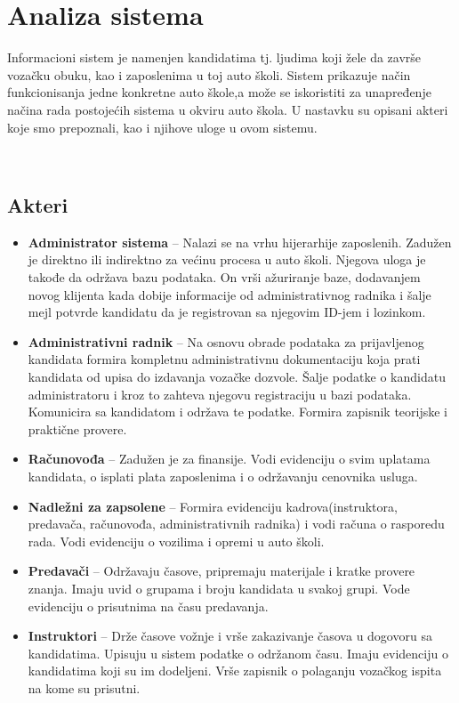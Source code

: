 \section{Analiza sistema}
\label{sec:naslov1}
 
Informacioni sistem je namenjen kandidatima tj. ljudima koji žele da završe vozačku obuku, kao i zaposlenima u toj auto školi. Sistem prikazuje način funkcionisanja jedne konkretne auto škole,a može se iskoristiti za unapređenje načina rada postojećih sistema u okviru auto škola.
U nastavku su opisani akteri koje smo prepoznali, kao i njihove uloge u ovom sistemu.

\
\subsection {Akteri}
\label{subsec:podnaslov1}
\begin{itemize}
\item \textbf{Administrator sistema} – Nalazi se na vrhu hijerarhije zaposlenih. Zadužen je direktno ili indirektno za većinu procesa u auto školi. Njegova uloga je takođe da održava bazu podataka. On vrši ažuriranje baze, dodavanjem novog klijenta kada dobije informacije od administrativnog radnika i šalje mejl potvrde kandidatu da je registrovan sa njegovim ID-jem i lozinkom.
\item \textbf{Administrativni radnik} – Na osnovu obrade podataka za prijavljenog kandidata formira kompletnu administrativnu dokumentaciju koja prati kandidata od upisa do izdavanja vozačke dozvole. Šalje podatke o kandidatu administratoru i kroz to zahteva njegovu registraciju u bazi podataka. Komunicira sa kandidatom i održava te podatke. Formira zapisnik teorijske i praktične provere.
\item \textbf{Računovođa} – Zadužen je za finansije. Vodi evidenciju o svim uplatama kandidata, o isplati plata zaposlenima i o održavanju cenovnika usluga.
\item \textbf{Nadležni za zapsolene} – Formira evidenciju kadrova(instruktora, predavača, računovođa, administrativnih radnika) i vodi računa o rasporedu rada. Vodi evidenciju o vozilima i opremi u auto školi.
\item \textbf{Predavači} – Održavaju časove, pripremaju materijale i kratke provere znanja. Imaju uvid o grupama i broju kandidata u svakoj grupi. Vode evidenciju o prisutnima na času predavanja.
\item \textbf{Instruktori} – Drže časove vožnje i vrše zakazivanje časova u dogovoru sa kandidatima. Upisuju u sistem podatke o održanom času. Imaju evidenciju o kandidatima koji su im dodeljeni. Vrše zapisnik o polaganju vozačkog ispita na kome su prisutni.

\end{itemize}
